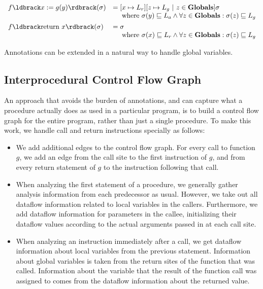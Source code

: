 \documentclass[11pt]{article}
\newcommand{\parg}[1] %
  {\ldbrack #1 \rdbrack}
\newcommand{\alap}{\sqsubseteq}
\begin{document}
\[
\begin{array}{lll}

f\parg{x := g(y)}(\sigma) & = [x \mapsto L_r][z \mapsto L_g ~|~ z \in \mathbf{Globals}]\sigma\\
& ~~~~\mbox{where}~ \sigma(y) \alap L_a \land \forall z \in \mathbf{Globals}: \sigma(z) \alap L_g\\[1ex]
f\parg{\mbox{return}~ x}(\sigma) & = \sigma\\
& ~~~~\mbox{where}~ \sigma(x) \alap L_r \land \forall z \in \mathbf{Globals}: \sigma(z) \alap L_g\\

\end{array}
\]

Annotations can be extended in a natural way to handle global variables.

\subsection{Interprocedural Control Flow Graph}

An approach that avoids the burden of annotations, and can capture what a procedure actually does as used in a particular program, is to build a control flow graph for the entire program, rather than just a single procedure.  To make this work, we handle call and return instructions specially as follows:

\begin{itemize}

\item We add additional edges to the control flow graph.  For every call to function $g$, we add an edge from the call site to the first instruction of $g$, and from every return statement of $g$ to the instruction following that call.

\item When analyzing the first statement of a procedure, we generally gather analysis information from each predecessor as usual.  However, we take out all dataflow information related to local variables in the callers.  Furthermore, we add dataflow information for parameters in the callee, initializing their dataflow values according to the actual arguments passed in at each call site.

\item When analyzing an instruction immediately after a call, we get dataflow information about local variables from the previous statement.  Information about global variables is taken from the return sites of the function that was called.  Information about the variable that the result of the function call was assigned to comes from the dataflow information about the returned value.

\end{itemize}
\end{document}
